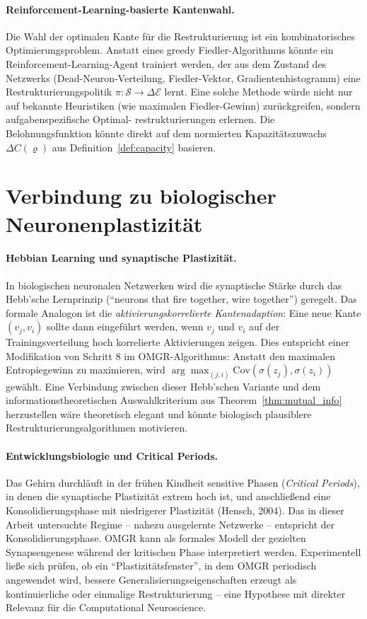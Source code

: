 \documentclass[12pt, a4paper, openany]{report}
\newcommand{\calE}{\mathcal{E}}
\begin{document}
\paragraph{Reinforcement-Learning-basierte Kantenwahl.}
Die Wahl der optimalen Kante für die Restrukturierung ist ein kombinatorisches
Optimierungsproblem.  Anstatt eines greedy Fiedler-Algorithmus könnte ein
Reinforcement-Learning-Agent trainiert werden, der aus dem Zustand des
Netzwerks (Dead-Neuron-Verteilung, Fiedler-Vektor, Gradientenhistogramm)
eine Restrukturierungspolitik $\pi : \mathcal{S} \to \Delta\calE$ lernt.
Eine solche Methode würde nicht nur auf bekannte Heuristiken (wie maximalen
Fiedler-Gewinn) zurückgreifen, sondern aufgabenspezifische Optimal-
restrukturierungen erlernen.  Die Belohnungsfunktion könnte direkt auf
dem normierten Kapazitätszuwachs $\Delta C(\varrho)$ aus Definition~\ref{def:capacity}
basieren.

\section{Verbindung zu biologischer Neuronenplastizität}
\label{sec:outlook_bio}

\paragraph{Hebbian Learning und synaptische Plastizität.}
In biologischen neuronalen Netzwerken wird die synaptische Stärke durch
das Hebb'sche Lernprinzip (``neurons that fire together, wire together'')
geregelt.  Das formale Analogon ist die \emph{aktivierungskorrelierte
Kantenadaption}: Eine neue Kante $(v_j, v_i)$ sollte dann eingeführt
werden, wenn $v_j$ und $v_i$ auf der Trainingsverteilung hoch korrelierte
Aktivierungen zeigen.  Dies entspricht einer Modifikation von Schritt 8 im
OMGR-Algorithmus: Anstatt den maximalen Entropiegewinn zu maximieren,
wird $\arg\max_{(j,i)} \mathrm{Cov}(\sigma(z_j), \sigma(z_i))$ gewählt.
Eine Verbindung zwischen dieser Hebb'schen Variante und dem
informationstheoretischen Auswahlkriterium aus Theorem~\ref{thm:mutual_info}
herzustellen wäre theoretisch elegant und könnte biologisch plausiblere
Restrukturierungsalgorithmen motivieren.

\paragraph{Entwicklungsbiologie und Critical Periods.}
Das Gehirn durchläuft in der frühen Kindheit sensitive Phasen
(\emph{Critical Periods}), in denen die synaptische Plastizität extrem
hoch ist, und anschließend eine Konsolidierungsphase mit niedrigerer
Plastizität (Hensch, 2004).  Das in dieser Arbeit untersuchte Regime --
nahezu ausgelernte Netzwerke -- entspricht der Konsolidierungsphase.
OMGR kann als formales Modell der gezielten Synapsengenese während
der kritischen Phase interpretiert werden.  Experimentell ließe sich
prüfen, ob ein ``Plastizitätsfenster'', in dem OMGR periodisch angewendet
wird, bessere Generalisierungseigenschaften erzeugt als kontinuierliche
oder einmalige Restrukturierung -- eine Hypothese mit direkter
Relevanz für die Computational Neuroscience.
\end{document}
